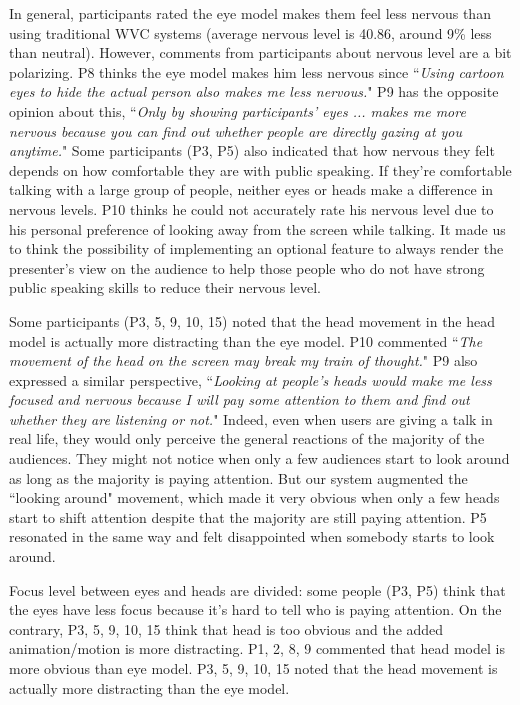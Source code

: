 In general, participants rated the eye model makes them feel less nervous than using traditional WVC systems (average nervous level is 40.86, around 9\% less than neutral). However, comments from participants about nervous level are a bit polarizing. P8 thinks the eye model makes him less nervous since ``\textit{Using cartoon eyes to hide the actual person also makes me less nervous.}" P9 has the opposite opinion about this, ``\textit{Only by showing participants' eyes ... makes me more nervous because you can find out whether people are directly gazing at you anytime.}"
Some participants (P3, P5) also indicated that how nervous they felt depends on how comfortable they are with public speaking. If they’re comfortable talking with a large group of people, neither eyes or heads make a difference in nervous levels. P10 thinks he could not accurately rate his nervous level due to his personal preference of looking away from the screen while talking. It made us to think the possibility of implementing an optional feature to always render the presenter’s view on the audience to help those people who do not have strong public speaking skills to reduce their nervous level. 

Some participants (P3, 5, 9, 10, 15) noted that the head movement in the head model is actually more distracting than the eye model. P10 commented  ``\textit{The movement of the head on the screen may break my train of thought.}" P9 also expressed a similar perspective, ``\textit{Looking at people's heads would make me less focused and nervous because I will pay some attention to them and find out whether they are listening or not.}" Indeed, even when users are giving a talk in real life, they would only perceive the general reactions of the majority of the audiences. They might not notice when only a few audiences start to look around as long as the majority is paying attention. But our system augmented the ``looking around" movement, which made it very obvious when only a few heads start to shift attention despite that the majority are still paying attention. P5 resonated in the same way and felt disappointed when somebody starts to look around.

 

Focus level between eyes and heads are divided: some people (P3, P5) think that the eyes have less focus because it’s hard to tell who is paying attention. On the contrary, P3, 5, 9, 10, 15 think that head is too obvious and the added animation/motion is more distracting. 
P1, 2, 8, 9 commented that head model is more obvious than eye model. 
P3, 5, 9, 10, 15 noted that the head movement is actually more distracting than the eye model.  

